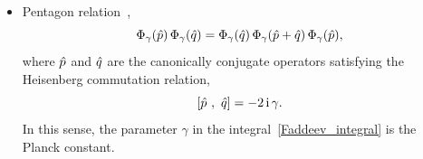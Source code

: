 \documentclass[12pt]{article}
\numberwithin{equation}{section}
\begin{document}
\begin{itemize}
\begin{subequations}
  \end{subequations}

\item Pentagon relation~\cite{FaddKash94,ChekFock99a,LFadd99b},
    \begin{equation}
      \label{pentagon_Phi}
      \Phi_\gamma(\Hat{p}) \, \Phi_\gamma(\Hat{q})
      =
      \Phi_\gamma(\Hat{q}) \, \Phi_\gamma(\Hat{p} + \Hat{q}) \,
      \Phi_\gamma(\Hat{p})  ,
    \end{equation}
    where $\Hat{p}$ and $\Hat{q}$ are the canonically conjugate
    operators satisfying the Heisenberg commutation relation,
    \begin{equation}
      \label{canonical}
      [\Hat{p} ~,~ \Hat{q} ] = - 2 \, \mathrm{i} \, \gamma .  
    \end{equation}
    In this sense, the parameter $\gamma$ in the
    integral~\eqref{Faddeev_integral}  is the Planck constant.


\end{itemize}
\end{document}
